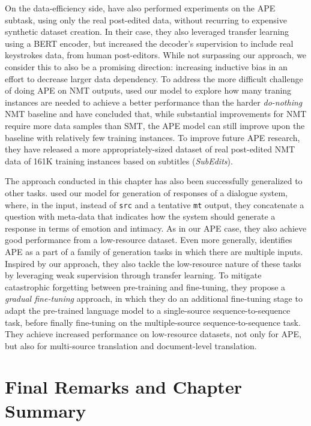 On the data-efficiency side,
\citet{gois2020LearningNonMonotonicAutomatic} have also performed
experiments on the APE subtask, using only the real post-edited data,
without recurring to expensive synthetic dataset creation. In their
case, they also leveraged transfer learning using a BERT encoder, but
increased the decoder's supervision to include real keystrokes data,
from human post-editors. While not surpassing our approach, we
consider this to also be a promising direction: increasing inductive
bias in an effort to decrease larger data dependency. To address the
more difficult challenge of doing APE on NMT outputs,
\citet{chollampatt2020CanAutomaticPostEditing} used our model to
explore how many traning instances are needed to achieve a better
performance than the harder \emph{do-nothing} NMT baseline and have
concluded that, while substantial improvements for NMT require more
data samples than SMT, the APE model can still improve upon the
baseline with relatively few training instances. To improve future
APE research, they have released a more appropriately-sized dataset
of real post-edited NMT data of 161K training instances based on
subtitles (\emph{SubEdits}).

The approach conducted in this chapter has also been successfully
generalized to other tasks. \citet{kodama2020GeneratingResponsesthat}
used our model for generation of responses of a dialogue system,
where, in the input, instead of \texttt{src} and a tentative
\texttt{mt} output, they concatenate a question with meta-data that
indicates how the system should generate a response in terms of
emotion and intimacy. As in our APE case, they also achieve good
performance from a low-resource dataset. Even more generally,
\citet{huang2021TransferLearningSequence} identifies APE as a part of
a family of generation tasks in which there are multiple inputs.
Inspired by our approach, they also tackle the low-resource nature of
these tasks by leveraging weak supervision through transfer learning.
To mitigate catastrophic forgetting between pre-training and
fine-tuning, they propose a \emph{gradual fine-tuning} approach, in
which they do an additional fine-tuning stage to adapt the
pre-trained language model to a single-source sequence-to-sequence
task, before finally fine-tuning on the multiple-source
sequence-to-sequence task. They achieve increased performance on
low-resource datasets, not only for APE, but also for multi-source
translation and document-level translation.

\section{Final Remarks and Chapter Summary}

